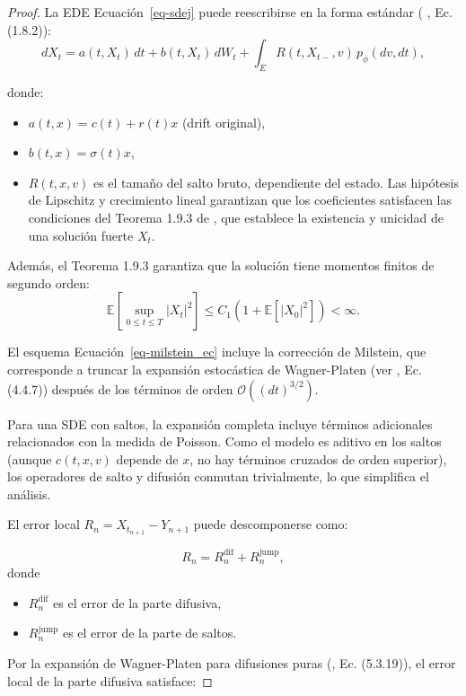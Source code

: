 \documentclass[
  spanish,
  us-letterpaper,
]{scrreprt}
\providecommand{\tightlist}{%
  \setlength{\itemsep}{0pt}\setlength{\parskip}{0pt}}
\theoremstyle{plain}
\theoremstyle{plain}
\theoremstyle{definition}
\theoremstyle{remark}
\begin{document}
\begin{proof}
La EDE Ecuación~\ref{eq-sdej} puede reescribirse en la forma estándar (
\textcite{platen2010numerical}, Ec. (1.8.2)):
\[d X_t = a(t,X_t)\,d t + b(t,X_t)\,dW_t + \int_E R(t,X_{t-},v)\,p_\phi(dv, d t),\]

donde:

\begin{itemize}
\item
  \(a(t,x) = c(t) + r(t)x\) (drift original),
\item
  \(b(t,x) = \sigma(t)x\),
\item
  \(R(t,x,v)\) es el tamaño del salto bruto, dependiente del estado. Las
  hipótesis de Lipschitz y crecimiento lineal garantizan que los
  coeficientes satisfacen las condiciones del Teorema 1.9.3 de
  \textcite{platen2010numerical}, que establece la existencia y unicidad
  de una solución fuerte \(X_t\).
\end{itemize}

Además, el Teorema 1.9.3 garantiza que la solución tiene momentos
finitos de segundo orden:
\[\mathbb{E}\left[ \sup_{0 \leq t \leq T} |X_t|^2 \right] \leq C_1 (1 + \mathbb{E}[|X_0|^2]) < \infty.\]

El esquema Ecuación~\ref{eq-milstein_ec} incluye la corrección de
Milstein, que corresponde a truncar la expansión estocástica de
Wagner-Platen (ver \textcite{platen2010numerical}, Ec. (4.4.7)) después
de los términos de orden \(\mathcal{O}((dt)^{3/2})\).

Para una SDE con saltos, la expansión completa incluye términos
adicionales relacionados con la medida de Poisson. Como el modelo es
aditivo en los saltos (aunque \(c(t,x,v)\) depende de \(x\), no hay
términos cruzados de orden superior), los operadores de salto y difusión
conmutan trivialmente, lo que simplifica el análisis.

El error local \(R_n = X_{t_{n+1}} - Y_{n+1}\) puede descomponerse como:

\[R_n = R_n^{\text{dif}} + R_n^{\text{jump}},\] donde

\begin{itemize}
\tightlist
\item
  \(R_n^{\text{dif}}\) es el error de la parte difusiva,
\item
  \(R_n^{\text{jump}}\) es el error de la parte de saltos.
\end{itemize}

Por la expansión de Wagner-Platen para difusiones puras
(\textcite{platen2010numerical}, Ec. (5.3.19)), el error local de la
parte difusiva satisface:


\end{proof}
\end{document}
